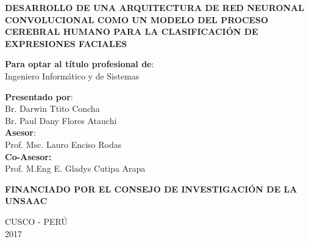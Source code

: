 \documentclass[letterpaper,12pt]{report}
\begin{document}
\begin{center}  {\textsc{\textbf{DESARROLLO DE UNA ARQUITECTURA DE RED NEURONAL
CONVOLUCIONAL COMO UN MODELO DEL PROCESO
CEREBRAL HUMANO PARA LA CLASIFICACIÓN DE
EXPRESIONES FACIALES}}}

\vspace{1.5cm}

{\textbf{Para optar al título profesional de}: \\Ingeniero Informático y de Sistemas\\[0.2cm ]
}

{\textbf{Presentado por}: \\
\hspace{-0.25cm} Br. Darwin Ttito Concha \\ 
\hspace{0.5cm} Br. Paul Dany Flores Atauchi \\[0.2cm ]
\textbf{Asesor}: \\Prof. Msc. Lauro Enciso Rodas \\[0.2cm]
\textbf{Co-Asesor:} \\Prof. M.Eng E. Gladys Cutipa Arapa \\[0.2cm]
}

\vspace{1.0cm}
\begin{center} {\tiny  \textbf{FINANCIADO POR EL CONSEJO DE INVESTIGACIÓN DE LA UNSAAC}} \end{center}
\begin{center} {CUSCO - PERÚ\\
2017} \end{center}
\end{center}

\clearpage
\end{document}
